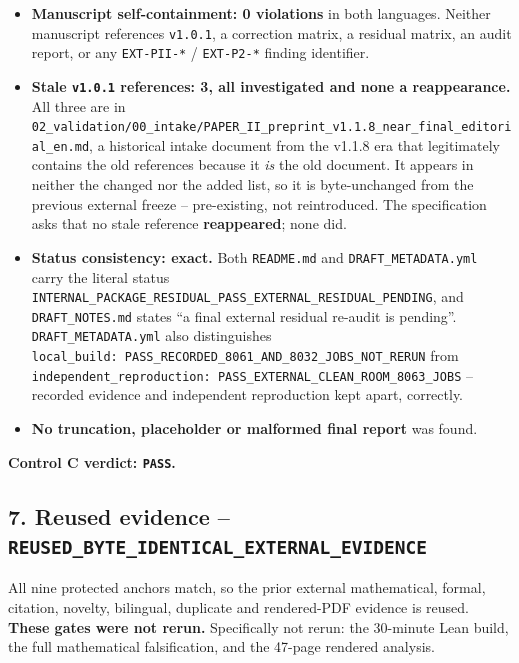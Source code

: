 \documentclass[
  10pt,
]{article}
\newcounter{none} %
\providecommand{\tightlist}{%
  \setlength{\itemsep}{0pt}\setlength{\parskip}{0pt}}
\begin{document}
\begin{itemize}
\tightlist
\item
  \textbf{Manuscript self-containment: 0 violations} in both languages.
  Neither manuscript references \texttt{v1.0.1}, a correction matrix, a
  residual matrix, an audit report, or any \texttt{EXT-PII-*} /
  \texttt{EXT-P2-*} finding identifier.
\item
  \textbf{Stale \texttt{v1.0.1} references: 3, all investigated and none
  a reappearance.} All three are in
  \texttt{02\_validation/00\_intake/PAPER\_II\_preprint\_v1.1.8\_near\_final\_editorial\_en.md},
  a historical intake document from the v1.1.8 era that legitimately
  contains the old references because it \emph{is} the old document. It
  appears in neither the changed nor the added list, so it is
  byte-unchanged from the previous external freeze -- pre-existing, not
  reintroduced. The specification asks that no stale reference
  \textbf{reappeared}; none did.
\item
  \textbf{Status consistency: exact.} Both \texttt{README.md} and
  \texttt{DRAFT\_METADATA.yml} carry the literal status
  \texttt{INTERNAL\_PACKAGE\_RESIDUAL\_PASS\_EXTERNAL\_RESIDUAL\_PENDING},
  and \texttt{DRAFT\_NOTES.md} states ``a final external residual
  re-audit is pending''. \texttt{DRAFT\_METADATA.yml} also distinguishes
  \texttt{local\_build:\ PASS\_RECORDED\_8061\_AND\_8032\_JOBS\_NOT\_RERUN}
  from
  \texttt{independent\_reproduction:\ PASS\_EXTERNAL\_CLEAN\_ROOM\_8063\_JOBS}
  -- recorded evidence and independent reproduction kept apart,
  correctly.
\item
  \textbf{No truncation, placeholder or malformed final report} was
  found.
\end{itemize}

\textbf{Control C verdict: \texttt{PASS}.}

\subsection{\texorpdfstring{7. Reused evidence --
\texttt{REUSED\_BYTE\_IDENTICAL\_EXTERNAL\_EVIDENCE}}{7. Reused evidence -- REUSED\_BYTE\_IDENTICAL\_EXTERNAL\_EVIDENCE}}\label{reused-evidence-reused_byte_identical_external_evidence}

All nine protected anchors match, so the prior external mathematical,
formal, citation, novelty, bilingual, duplicate and rendered-PDF
evidence is reused. \textbf{These gates were not rerun.} Specifically
not rerun: the 30-minute Lean build, the full mathematical
falsification, and the 47-page rendered analysis.
\end{document}
